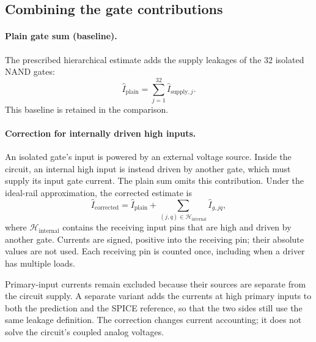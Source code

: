 \documentclass{article}
\begin{document}
\subsection{Combining the gate contributions}
\paragraph{Plain gate sum (baseline).}
The prescribed hierarchical estimate adds the supply leakages of the
32 isolated NAND gates:
\begin{equation}
\widehat I_{\mathrm{plain}}=\sum_{j=1}^{32}\widehat I_{\mathrm{supply},j}.
\end{equation}
This baseline is retained in the comparison.

\paragraph{Correction for internally driven high inputs.}
An isolated gate's input is powered by an external voltage source. Inside
the circuit, an internal high input is instead driven by another gate,
which must supply its input gate current. The plain sum omits this
contribution. Under the ideal-rail approximation, the corrected estimate is
\begin{equation}
\widehat I_{\mathrm{corrected}}=
\widehat I_{\mathrm{plain}}+
\sum_{(j,q)\in\mathcal H_{\mathrm{internal}}}\widehat I_{g,jq},
\end{equation}
where $\mathcal H_{\mathrm{internal}}$ contains the receiving input pins
that are high and driven by another gate. Currents are signed, positive
into the receiving pin; their absolute values are not used. Each receiving
pin is counted once, including when a driver has multiple loads.

Primary-input currents remain excluded because their sources are separate
from the circuit supply. A separate variant adds the currents at high
primary inputs to both the prediction and the SPICE reference, so that the
two sides still use the same leakage definition. The correction changes
current accounting; it does not solve the circuit's coupled analog voltages.
\end{document}
